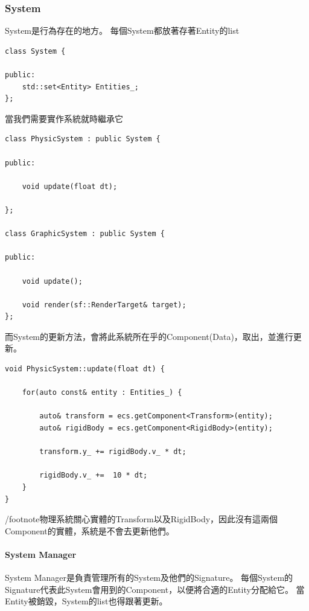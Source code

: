 \subsubsection{System}

System是行為存在的地方。
每個System都放著存著Entity的list


\begin{lstlisting}
class System {

public:
    std::set<Entity> Entities_;
};
\end{lstlisting}

當我們需要實作系統就時繼承它

\begin{lstlisting}
class PhysicSystem : public System {

public:

    void update(float dt);

};

class GraphicSystem : public System {

public:

    void update();
    
    void render(sf::RenderTarget& target);
};
\end{lstlisting}

而System的更新方法，會將此系統所在乎的Component(Data)，取出，並進行更新。

\begin{lstlisting}
void PhysicSystem::update(float dt) {

    for(auto const& entity : Entities_) {

        auto& transform = ecs.getComponent<Transform>(entity);
        auto& rigidBody = ecs.getComponent<RigidBody>(entity);

        transform.y_ += rigidBody.v_ * dt;

        rigidBody.v_ +=  10 * dt;
    }
}
\end{lstlisting}

/footnote{物理系統關心實體的Transform以及RigidBody，因此沒有這兩個 Component的實體，系統是不會去更新他們。}


\paragraph{System Manager}

System Manager是負責管理所有的System及他們的Signature。
每個System的Signature代表此System會用到的Component，以便將合適的Entity分配給它。
當Entity被銷毀，System的list也得跟著更新。

